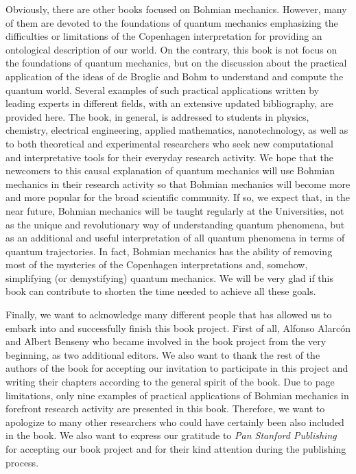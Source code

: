 \documentclass[nofootinbib, secnumarabic, amsmath, nobibnotes,10pt,aps,pra]{revtex4-1}
\begin{document}
Obviously, there are other books focused on Bohmian mechanics. However, many of them are devoted to the foundations of quantum mechanics emphasizing the difficulties or limitations of the Copenhagen interpretation for providing an ontological description of our world. On the contrary, this book is not focus on the foundations of quantum mechanics, but on the discussion about the practical application of the ideas of de Broglie and Bohm to understand and compute the quantum world. Several examples of such practical applications written by leading experts in different fields, with an extensive updated bibliography, are provided here. The book, in general, is addressed to students in physics, chemistry, electrical engineering, applied mathematics, nanotechnology, as well as to both theoretical and experimental researchers who seek new computational and interpretative tools for their everyday research activity. We hope that the newcomers to this causal explanation of quantum mechanics will use Bohmian mechanics in their research activity so that Bohmian mechanics will become more and more popular for the broad scientific community. If so, we expect that, in the near future, Bohmian mechanics will be taught regularly at the Universities, not as the unique and revolutionary way of understanding quantum phenomena, but as an additional and useful interpretation of all quantum phenomena in terms of quantum trajectories. In fact, Bohmian mechanics has the ability of removing most of the mysteries of the Copenhagen interpretations and, somehow, simplifying (or demystifying) quantum mechanics. We will be very glad if this book can contribute to shorten the time needed to achieve all these goals.

Finally, we want to acknowledge many different people that has allowed us to embark into and successfully finish this book project. First of all, Alfonso Alarc\'on and Albert Benseny who became involved in the book project from the very beginning, as two additional editors. We also want to thank the rest of the authors of the book for accepting our invitation to participate in this project and writing their chapters according to the general spirit of the book. Due to page limitations, only nine examples of practical applications of Bohmian mechanics in forefront research activity are presented in this book. Therefore, we want to apologize to many other researchers who could have certainly been also included in the book. We also want to express our gratitude to \emph{Pan Stanford Publishing} for accepting our book project and for their kind attention during the publishing process.
\end{document}
